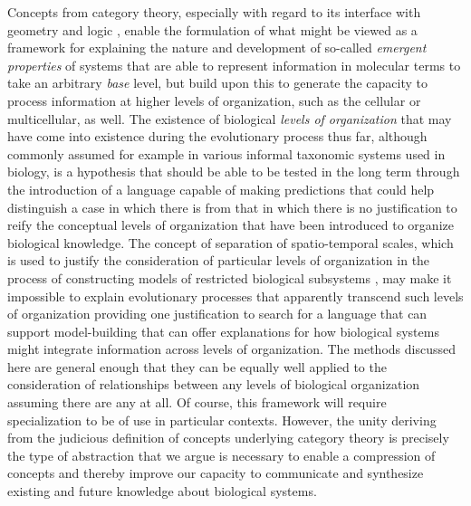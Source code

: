 \documentclass[aps,twocolumn]{revtex4-1}
\begin{document}
Concepts from category theory, especially with regard to its interface with geometry and logic \cite{MacLane1992,Jacobs1998}, enable the formulation of what might be viewed as a framework for explaining the nature and development of so-called \emph{emergent properties} of systems that are able to represent information in molecular terms to take an arbitrary {\it base} level, but build upon this to generate the capacity to process information at higher levels of organization, such as the cellular or multicellular, as well. The existence of biological {\it levels of organization} that may have come into existence during the evolutionary process thus far, although commonly assumed for example in various informal taxonomic systems used in biology, is a hypothesis that should be able to be tested in the long term through the introduction of a language capable of making predictions that could help distinguish a case in which there is from that in which there is no justification to reify the conceptual levels of organization that have been introduced to organize biological knowledge. The concept of separation of spatio-temporal scales, which is used to justify the consideration of particular levels of organization in the process of constructing models of restricted biological subsystems \cite{Gunawardena2012,Karr2012}, may make it impossible to explain evolutionary processes that apparently transcend such levels of organization providing one justification to search for a language that can support model-building that can offer explanations for how biological systems might integrate information across levels of organization. The methods discussed here are general enough that they can be equally well applied to the consideration of relationships between any levels of biological organization assuming there are any at all. Of course, this framework will require specialization to be of use in particular contexts. However, the unity deriving from the judicious definition of concepts underlying category theory is precisely the type of abstraction that we argue is necessary to enable a compression of concepts and thereby improve our capacity to communicate and synthesize existing and future knowledge about biological systems.
\end{document}
